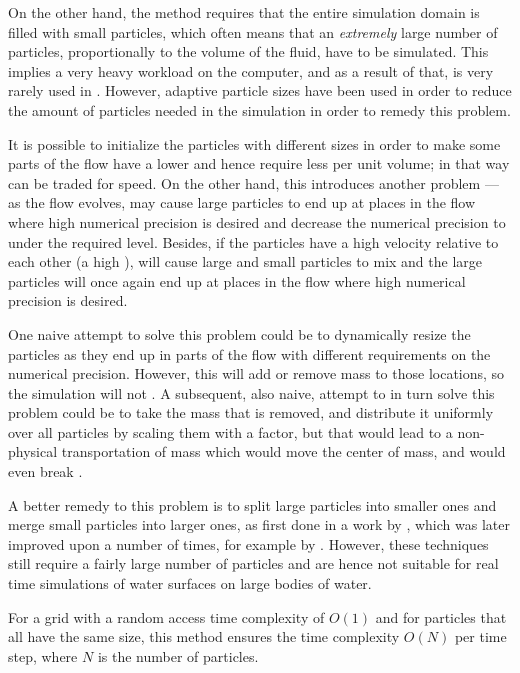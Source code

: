 On the other hand, the \SPH method requires that the entire simulation domain is filled with small particles, which often means that an \emph{extremely} large number of particles, proportionally to the volume of the fluid, have to be simulated. This implies a very heavy workload on the computer, and as a result of that, \SPH is very rarely used in . However, adaptive particle sizes have been used in order to reduce the amount of particles needed in the simulation in order to remedy this problem.

It is possible to initialize the particles with different sizes in order to make some parts of the flow have a lower  and hence require less  per unit volume; in that way  can be traded for speed. On the other hand, this introduces another problem --- as the flow evolves, \advection may cause large particles to end up at places in the flow where high numerical precision is desired and decrease the numerical precision to under the required level. Besides, if the particles have a high velocity relative to each other (a high \temperature), \diffusion will cause large and small particles to mix and the large particles will once again end up at places in the flow where high numerical precision is desired.

One naive attempt to solve this problem could be to dynamically resize the particles as they end up in parts of the flow with different requirements on the numerical precision. However, this will add or remove mass to those locations, so the simulation will not . A subsequent, also naive, attempt to in turn solve this problem could be to take the mass that is removed, and distribute it uniformly over all particles by scaling them with a factor, but that would lead to a non-physical transportation of mass which would move the center of mass, and would even break .

A better remedy to this problem is to split large particles into smaller ones and merge small particles into larger ones, as first done in a work by \citet{Desbrun1999}, which was later improved upon a number of times, for example by \citet{Yan2009}. However, these techniques still require a fairly large number of particles and are hence not suitable for real time simulations of water surfaces on large bodies of water.

For a grid with a random access time complexity of $O(1)$ and for particles that all have the same size, this method ensures the time complexity $O(N)$ per time step, where $N$ is the number of particles.

